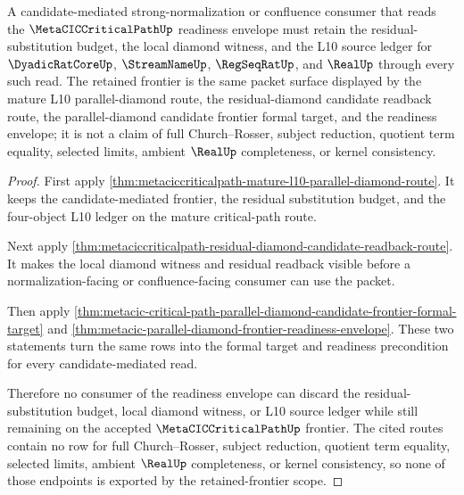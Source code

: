 \begin{theorem}
\label{thm:metacic-parallel-diamond-retained-frontier-scope}
A candidate-mediated strong-normalization or confluence consumer that reads the $\MetaCICCriticalPathUp$ readiness envelope must retain the residual-substitution budget, the local diamond witness, and the L10 source ledger for $\DyadicRatCoreUp$, $\StreamNameUp$, $\RegSeqRatUp$, and $\RealUp$ through every such read. The retained frontier is the same packet surface displayed by the mature L10 parallel-diamond route, the residual-diamond candidate readback route, the parallel-diamond candidate frontier formal target, and the readiness envelope; it is not a claim of full Church--Rosser, subject reduction, quotient term equality, selected limits, ambient $\RealUp$ completeness, or kernel consistency.
\end{theorem}
\begin{proof}
First apply \autoref{thm:metaciccriticalpath-mature-l10-parallel-diamond-route}. It keeps the candidate-mediated frontier, the residual substitution budget, and the four-object L10 ledger on the mature critical-path route.

Next apply \autoref{thm:metaciccriticalpath-residual-diamond-candidate-readback-route}. It makes the local diamond witness and residual readback visible before a normalization-facing or confluence-facing consumer can use the packet.

Then apply \autoref{thm:metacic-critical-path-parallel-diamond-candidate-frontier-formal-target} and \autoref{thm:metacic-parallel-diamond-frontier-readiness-envelope}. These two statements turn the same rows into the formal target and readiness precondition for every candidate-mediated read.

Therefore no consumer of the readiness envelope can discard the residual-substitution budget, local diamond witness, or L10 source ledger while still remaining on the accepted $\MetaCICCriticalPathUp$ frontier. The cited routes contain no row for full Church--Rosser, subject reduction, quotient term equality, selected limits, ambient $\RealUp$ completeness, or kernel consistency, so none of those endpoints is exported by the retained-frontier scope.
\end{proof}

